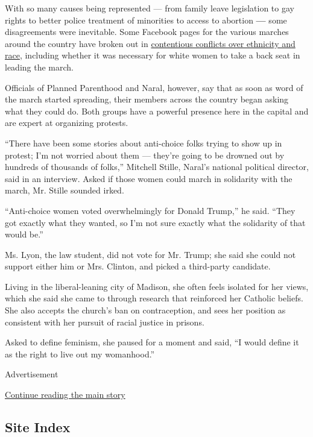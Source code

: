 With so many causes being represented --- from family leave legislation
to gay rights to better police treatment of minorities to access to
abortion \textbf{---} some disagreements were inevitable. Some Facebook
pages for the various marches around the country have broken out in
\href{https://www.nytimes.com/2017/01/09/us/womens-march-on-washington-opens-contentious-dialogues-about-race.html?_r=0}{contentious
conflicts over ethnicity and race}, including whether it was necessary
for white women to take a back seat in leading the march.

Officials of Planned Parenthood and Naral, however, say that as soon as
word of the march started spreading, their members across the country
began asking what they could do. Both groups have a powerful presence
here in the capital and are expert at organizing protests.

``There have been some stories about anti-choice folks trying to show up
in protest; I'm not worried about them --- they're going to be drowned
out by hundreds of thousands of folks,'' Mitchell Stille, Naral's
national political director, said in an interview. Asked if those women
could march in solidarity with the march, Mr. Stille sounded irked.

``Anti-choice women voted overwhelmingly for Donald Trump,'' he said.
``They got exactly what they wanted, so I'm not sure exactly what the
solidarity of that would be.''

Ms. Lyon, the law student, did not vote for Mr. Trump; she said she
could not support either him or Mrs. Clinton, and picked a third-party
candidate.

Living in the liberal-leaning city of Madison, she often feels isolated
for her views, which she said she came to through research that
reinforced her Catholic beliefs. She also accepts the church's ban on
contraception, and sees her position as consistent with her pursuit of
racial justice in prisons.

Asked to define feminism, she paused for a moment and said, ``I would
define it as the right to live out my womanhood.''

Advertisement

\protect\hyperlink{after-bottom}{Continue reading the main story}

\hypertarget{site-index}{%
\subsection{Site Index}\label{site-index}}

